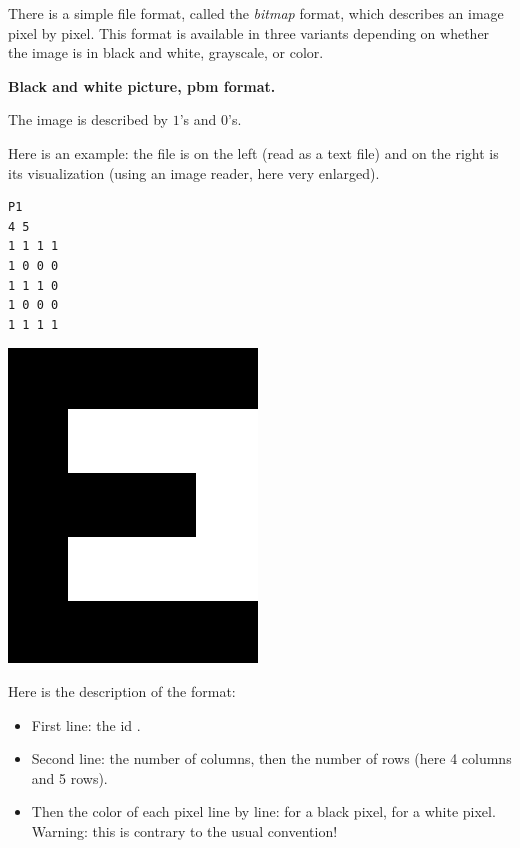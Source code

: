 \documentclass[11pt,class=report,crop=false]{standalone}
\begin{document}
\begin{cours}


There is a simple file format, called the \emph{bitmap} format, which describes an image pixel by pixel. This format is available in three variants 
depending on whether the image is in black and white, grayscale, or color.

\medskip

\textbf{Black and white picture, \og{}pbm\fg{} format.}

The image is described by $1$'s and $0$'s.

Here is an example: the  file is on the left (read as a text file) and on the right is its visualization (using an image reader, here very enlarged).
\begin{center}
\begin{minipage}{0.3\textwidth}
\begin{lstlisting}
P1
4 5
1 1 1 1
1 0 0 0
1 1 1 0
1 0 0 0
1 1 1 1
\end{lstlisting}
\end{minipage}
\begin{minipage}{0.3\textwidth}
\includegraphics[scale=\myscale,scale=0.2]{screen-lesson-image_nb}
\end{minipage}
\end{center}

Here is the description of the format:
\begin{itemize}
  \item First line: the id .
  \item Second line: the number of columns, then the number of rows (here 4 columns and 5 rows).
  \item Then the color of each pixel line by line:  for a black pixel,  for a white pixel. Warning: this is contrary to the usual convention!
\end{itemize}  
  

\end{cours}
\end{document}
